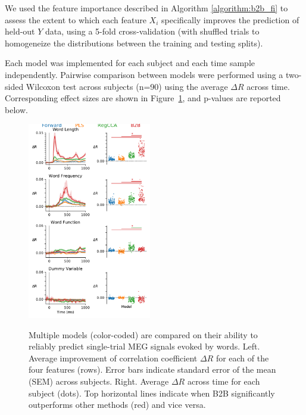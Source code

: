 We used the feature importance described in Algorithm \ref{algorithm:b2b_fi} to assess the extent to which each feature $X_i$ specifically improves the prediction of held-out $Y$ data, using a 5-fold cross-validation (with shuffled trials to homogeneize the distributions between the training and testing splits).

Each model was implemented for each subject and each time sample independently. Pairwise comparison between models were performed using a two-sided Wilcoxon test across subjects (n=90) using the average $\Delta R$ across time. Corresponding effect sizes are shown in Figure~\ref{fig:meg_results}, and p-values are reported below.



\begin{figure}
  \vspace{-11ex}
  \begin{center}
    \includegraphics[width=0.48\textwidth, trim=0cm 0cm 0cm 0cm, clip=True]{figures/meg.pdf}

    \label{fig:meg_results}
  \end{center}
  \caption{Multiple models (color-coded) are compared on their ability to reliably predict single-trial MEG signals evoked by words. Left. Average improvement of correlation coefficient $\Delta R$ for each of the four features (rows). Error bars indicate standard error of the mean (SEM) across subjects. Right. Average $\Delta R$ across time for each subject (dots). Top horizontal lines indicate when B2B significantly outperforms other methods (red) and vice versa.}
  \vspace{-6ex}
\end{figure}

